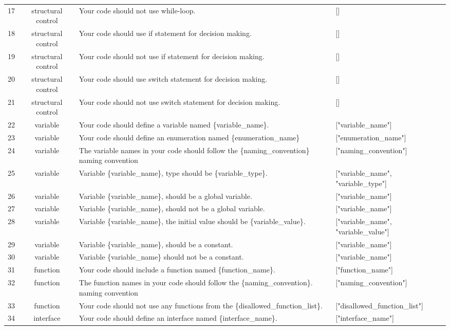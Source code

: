 \begin{table}[h]
\begin{tabular}{ccp{10cm}p{5cm}}
17 & structural control & Your code should not use while-loop. & [] \\
18 & structural control & Your code should use if statement for decision making. & [] \\
19 & structural control & Your code should not use if statement for decision making. & [] \\
20 & structural control & Your code should use switch statement for decision making. & [] \\
21 & structural control & Your code should not use switch statement for decision making. & [] \\
22 & variable & Your code should define a variable named \{variable\_name\}. & ["variable\_name"] \\
23 & variable & Your code should define an enumeration named \{enumeration\_name\} & ["enumeration\_name"] \\
24 & variable & The variable names in your code should follow the \{naming\_convention\} naming convention & ["naming\_convention"] \\
25 & variable & Variable \{variable\_name\}, type should be \{variable\_type\}. & ["variable\_name", "variable\_type"] \\
26 & variable & Variable \{variable\_name\}, should be a global variable. & ["variable\_name"] \\
27 & variable & Variable \{variable\_name\}, should not be a global variable. & ["variable\_name"] \\
28 & variable & Variable \{variable\_name\}, the initial value should be \{variable\_value\}. & ["variable\_name", "variable\_value"] \\
29 & variable & Variable \{variable\_name\}, should be a constant. & ["variable\_name"] \\
30 & variable & Variable \{variable\_name\} should not be a constant. & ["variable\_name"] \\
31 & function & Your code should include a function named \{function\_name\}. & ["function\_name"] \\
32 & function & The function names in your code should follow the \{naming\_convention\}. naming convention & ["naming\_convention"] \\
33 & function & Your code should not use any functions from the \{disallowed\_function\_list\}. & ["disallowed\_function\_list"] \\
34 & interface & Your code should define an interface named \{interface\_name\}. & ["interface\_name"] \\

\end{tabular}
\end{table}

